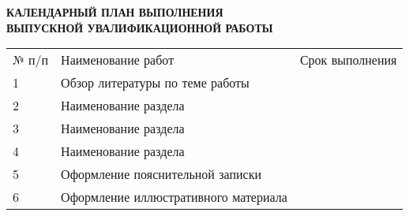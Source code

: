 \begin{center}
	\textbf{
		КАЛЕНДАРНЫЙ ПЛАН ВЫПОЛНЕНИЯ \\
		ВЫПУСКНОЙ УВАЛИФИКАЦИОННОЙ РАБОТЫ
	}

	\vspace*{2cm}

	\confirmation

	\vspace*{3cm}
	
	\worktitle

	\vspace*{4cm}
	
	\begin{tabularx}{\textwidth}{ l X l }
		№ п/п & Наименование работ & Срок выполнения \\
		1 & Обзор литературы по теме работы & \\
		2 & Наименование раздела & \\
		3 & Наименование раздела & \\
		4 & Наименование раздела & \\
		5 & Оформление пояснительной записки & \\
		6 & Оформление иллюстративного материала & \\
	\end{tabularx}

	\vspace*{4cm}

	\subsblock
\end{center}

\thispagestyle{empty}
\clearpage
